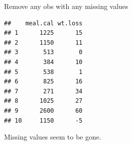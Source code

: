 \documentclass[ignorenonframetext,]{beamer}
\newenvironment{Shaded}{\begin{snugshade}}{\end{snugshade}}
\newcommand{\DecValTok}[1]{\textcolor[rgb]{0.00,0.00,0.81}{#1}}
\newcommand{\KeywordTok}[1]{\textcolor[rgb]{0.13,0.29,0.53}{\textbf{#1}}}
\newcommand{\NormalTok}[1]{#1}
\newcommand{\OperatorTok}[1]{\textcolor[rgb]{0.81,0.36,0.00}{\textbf{#1}}}
\newcommand{\StringTok}[1]{\textcolor[rgb]{0.31,0.60,0.02}{#1}}
\begin{document}
\begin{frame}[fragile]{Remove any obs with any missing values}
\protect\hypertarget{remove-any-obs-with-any-missing-values}{}

\begin{Shaded}
\end{Shaded}

\begin{verbatim}
##    meal.cal wt.loss
## 1      1225      15
## 2      1150      11
## 3       513       0
## 4       384      10
## 5       538       1
## 6       825      16
## 7       271      34
## 8      1025      27
## 9      2600      60
## 10     1150      -5
\end{verbatim}

Missing values seem to be gone.

\end{frame}
\end{document}
